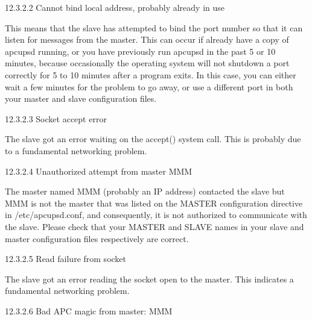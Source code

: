 {\small12.3.2.2 Cannot bind local address, probably already in use}

This means that the slave has attempted to bind the port number so that it can
listen for messages from the master. This can occur if already have a copy of
apcupsd running, or you have previously run apcupsd in the past 5 or 10
minutes, because occasionally the operating system will not shutdown a port
correctly for 5 to 10 minutes after a program exits. In this case, you can
either wait a few minutes for the problem to go away, or use a different port
in both your master and slave configuration files. 

\label{Socket-accept-error}

{\small12.3.2.3 Socket accept error}

The slave got an error waiting on the accept() system call. This is probably
due to a fundamental networking problem. 

\label{Unauthorized-attempt-from-master-MMM}

{\small12.3.2.4 Unauthorized attempt from master MMM}

The master named MMM (probably an IP address) contacted the slave but MMM is
not the master that was listed on the MASTER configuration directive in
/etc/apcupsd.conf, and consequently, it is not authorized to communicate with
the slave. Please check that your MASTER and SLAVE names in your slave and
master configuration files respectively are correct. 

\label{Read-failure-from-socket}

{\small12.3.2.5 Read failure from socket}

The slave got an error reading the socket open to the master. This indicates a
fundamental networking problem. 

\label{Bad-APC-magic-from-master_003b-MMM}

{\small12.3.2.6 Bad APC magic from master: MMM}

